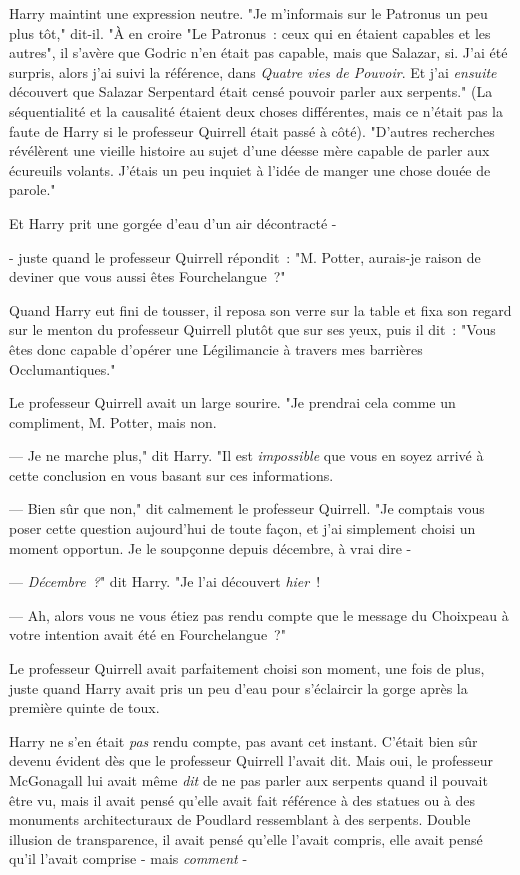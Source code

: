 Harry maintint une expression neutre. "Je m'informais sur le Patronus un peu plus tôt," dit-il. "À en croire "Le Patronus~: ceux qui en étaient capables et les autres", il s'avère que Godric n'en était pas capable, mais que Salazar, si. J'ai été surpris, alors j'ai suivi la référence, dans \emph{Quatre vies de Pouvoir}. Et j'ai \emph{ensuite} découvert que Salazar Serpentard était censé pouvoir parler aux serpents." (La séquentialité et la causalité étaient deux choses différentes, mais ce n'était pas la faute de Harry si le professeur Quirrell était passé à côté). "D'autres recherches révélèrent une vieille histoire au sujet d'une déesse mère capable de parler aux écureuils volants. J'étais un peu inquiet à l'idée de manger une chose douée de parole."

Et Harry prit une gorgée d'eau d'un air décontracté -

- juste quand le professeur Quirrell répondit~: "M. Potter, aurais-je raison de deviner que vous aussi êtes Fourchelangue~?"

Quand Harry eut fini de tousser, il reposa son verre sur la table et fixa son regard sur le menton du professeur Quirrell plutôt que sur ses yeux, puis il dit~: "Vous êtes donc capable d'opérer une Légilimancie à travers mes barrières Occlumantiques."

Le professeur Quirrell avait un large sourire. "Je prendrai cela comme un compliment, M. Potter, mais non.

--- Je ne marche plus," dit Harry. "Il est \emph{impossible} que vous en soyez arrivé à cette conclusion en vous basant sur ces informations.

--- Bien sûr que non," dit calmement le professeur Quirrell. "Je comptais vous poser cette question aujourd'hui de toute façon, et j'ai simplement choisi un moment opportun. Je le soupçonne depuis décembre, à vrai dire -

--- \emph{Décembre~?}" dit Harry. "Je l'ai découvert \emph{hier}~!

--- Ah, alors vous ne vous étiez pas rendu compte que le message du Choixpeau à votre intention avait été en Fourchelangue~?"

Le professeur Quirrell avait parfaitement choisi son moment, une fois de plus, juste quand Harry avait pris un peu d'eau pour s'éclaircir la gorge après la première quinte de toux.

Harry ne s'en était \emph{pas} rendu compte, pas avant cet instant. C'était bien sûr devenu évident dès que le professeur Quirrell l'avait dit. Mais oui, le professeur McGonagall lui avait même \emph{dit} de ne pas parler aux serpents quand il pouvait être vu, mais il avait pensé qu'elle avait fait référence à des statues ou à des monuments architecturaux de Poudlard ressemblant à des serpents. Double illusion de transparence, il avait pensé qu'elle l'avait compris, elle avait pensé qu'il l'avait comprise - mais \emph{comment} -

